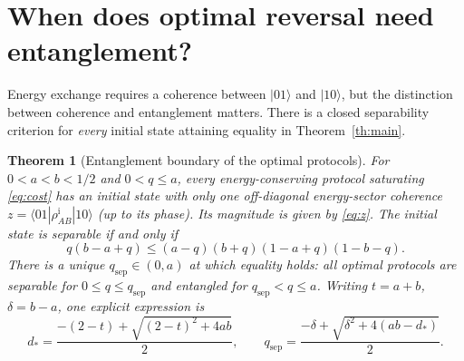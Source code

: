 \documentclass[11pt,a4paper]{article}
\newtheorem{theorem}{Theorem}
\begin{document}
\section{When does optimal reversal need entanglement?}
Energy exchange requires a coherence between $|01\rangle$ and $|10\rangle$, but the distinction between coherence and entanglement matters. There is a closed separability criterion for \emph{every} initial state attaining equality in Theorem~\ref{th:main}.
\begin{theorem}[Entanglement boundary of the optimal protocols]\label{th:ppt}
For $0<a<b<1/2$ and $0<q\le a$, every energy-conserving protocol saturating \eqref{eq:cost} has an initial state with only one off-diagonal energy-sector coherence $z=\langle01|\rho_{AB}^{\mathrm i}|10\rangle$ (up to its phase). Its magnitude is given by \eqref{eq:z}. The initial state is separable if and only if
\begin{equation}\label{eq:PPT}
\boxed{\quad q(b-a+q)\le(a-q)(b+q)(1-a+q)(1-b-q).\quad}
\end{equation}
There is a unique $q_{\mathrm{sep}}\in(0,a)$ at which equality holds: all optimal protocols are separable for $0\le q\le q_{\mathrm{sep}}$ and entangled for $q_{\mathrm{sep}}<q\le a$. Writing $t=a+b$, $\delta=b-a$, one explicit expression is
\begin{equation}\label{eq:qsep}
d_*=\frac{-(2-t)+\sqrt{(2-t)^2+4ab}}2,
\qquad
q_{\mathrm{sep}}=\frac{-\delta+\sqrt{\delta^2+4(ab-d_*)}}2.
\end{equation}
\end{theorem}
\end{document}
